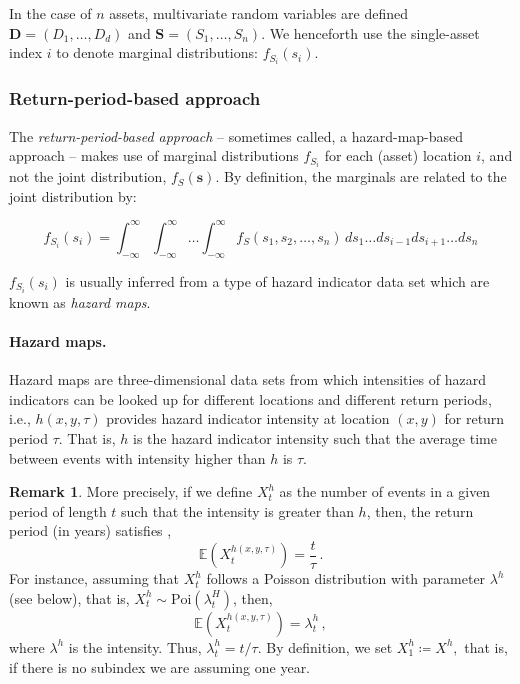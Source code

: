 \documentclass[a4paper,11pt]{extarticle} %
\theoremstyle{definition}
\newtheorem{remarkx}[theorem]{Remark}
\newenvironment{remark}
{\pushQED{\qed}\renewcommand{\qedsymbol}{$\diamond$}\begin{remarkx}}
    {\popQED\end{remarkx}}
\begin{document}
In the case of $n$ assets, multivariate random variables are defined $\mathbf{D} = (D_1,\ldots,D_d)$ and $\mathbf{S} = (S_1,\ldots,S_n)$. We henceforth use the single-asset index $i$ to denote marginal distributions: $f_{S_i}(s_i)$.

\subsubsection{Return-period-based approach}

The \emph{return-period-based approach} -- sometimes called, a hazard-map-based approach -- makes use of marginal distributions $f_{S_i}$ for each (asset) location $i$, and not the joint distribution, $f_S(\mathbf{s})$. By definition, the marginals are related to the joint distribution by:

 \begin{equation}
    \label{Eq:ImpactMarginal}
    f_{S_i}(s_i) = \int_{-\infty}^{\infty} \int_{-\infty}^{\infty} \dots \int_{-\infty}^{\infty} f_S(s_1,s_2, \dots,s_n) \,ds_1 \dots ds_{i-1} ds_{i + 1} \dots ds_n
\end{equation}

$f_{S_i}(s_i)$ is usually inferred from a type of hazard indicator data set which are known as \emph{hazard maps}.

\paragraph{Hazard maps.} Hazard maps are three-dimensional data sets from which intensities of hazard indicators can be looked up for different locations and different return periods, i.e., $h(x, y, \tau)$ provides hazard indicator intensity at location $(x, y)$ for return period $\tau$. That is, $h$ is the hazard indicator intensity such that the average time between events with intensity higher than $h$ is $\tau$.

\begin{remark}
    More precisely, if we define $X^h_t$ as the number of events in a given period of length $t$ such that the intensity is greater than $h$, then, the return period (in years) satisfies \cite{RaschkeEtAl:2022},
    \begin{equation}\label{Eq:ReturnPeriodDef}
        \mathbb{E}\left( X_t^{h(x,y, \tau)}\right)=\frac{t}{\tau}\,.
    \end{equation}
For instance, assuming that $X_t^h$ follows a Poisson distribution with parameter $\lambda^h$ (see below), that is, $X_t^h\sim\text{Poi}\left(\lambda^H_t\right)$, then,
$$
\mathbb{E}\left( X_t^{h(x,y, \tau)}\right)=\lambda^h_t\,,
$$
where $\lambda^h$ is the intensity. Thus, $\lambda^h_t = t/\tau .$ By definition, we set  $X_1^h\coloneqq X^h,$ that is, if there is no subindex we are assuming one year.
\end{remark}
\end{document}
